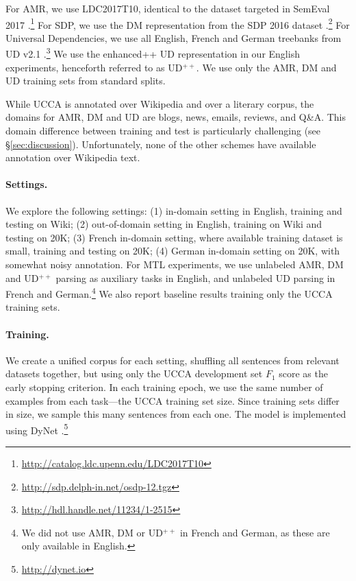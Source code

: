 \documentclass[11pt,a4paper]{article}
\begin{document}
For AMR, we use LDC2017T10, identical to the dataset targeted in SemEval 2017
\cite{may2017semeval}.\footnote{\mbox{\url{http://catalog.ldc.upenn.edu/LDC2017T10}}}
For SDP, we use the DM representation from the SDP 2016 dataset
\cite{oepen2016towards}.\footnote{\url{http://sdp.delph-in.net/osdp-12.tgz}}
For Universal Dependencies, we use all English, French and German treebanks from UD v2.1
\cite{11234/1-2515}.\footnote{\url{http://hdl.handle.net/11234/1-2515}}
We use the enhanced++ UD representation \cite{SCHUSTER16.779} in our English experiments,
henceforth referred to as UD$^{++}$.
We use only the AMR, DM and UD training sets from standard splits.

While UCCA is annotated over Wikipedia and over a literary corpus,
the domains for AMR, DM and UD are blogs, news, emails, reviews, and Q\&A.
This domain difference between training and test is particularly challenging (see \S\ref{sec:discussion}).
Unfortunately, none of the other schemes have available annotation over Wikipedia text.

\paragraph{Settings.}

We explore the following settings: 
(1) in-domain setting in English, training and testing on Wiki;
(2) out-of-domain setting in English, training on Wiki and testing on 20K;
(3) French in-domain setting, where available training dataset is small,
training and testing on 20K;
(4) German in-domain setting on 20K, with somewhat noisy annotation.
For MTL experiments, we use unlabeled AMR, DM and UD$^{++}$ parsing as auxiliary tasks in English,
and unlabeled UD parsing in French and German.\footnote{We did not use AMR, DM or UD$^{++}$ in French
and German, as these are only available in English.}
We also report baseline results training only the UCCA training sets.


\paragraph{Training.}

We create a unified corpus for each setting, shuffling all sentences from relevant datasets together,
but using only the UCCA development set $F_1$ score as the early stopping criterion.
In each training epoch, we use the same number of examples from each task---the
UCCA training set size.
Since training sets differ in size, we sample this many sentences from each one.
The model is implemented using DyNet \cite{neubig2017dynet}.\footnote{\url{http://dynet.io}}
\end{document}
